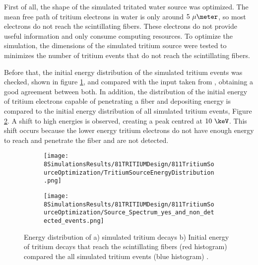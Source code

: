 First of all, the shape of the simulated tritated water source was optimized. The mean free path of tritium electrons in water is only around $5~\mu\meter$, so most electrons do not reach the scintillating fibers. These electrons do not provide useful information and only consume computing resources. To optimize the simulation, the dimensions of the simulated tritium source were tested to minimizes the number of tritium events that do not reach the scintillating fibers. 

Before that, the initial energy distribution of the simulated tritium events was checked, shown in figure \ref{subfig:EnergyDistributionTritiumSource}, and compared with the input taken from \cite{TritiumEmissionSpectrum}, obtaining a good agreement between both. In addition, the distribution of the initial energy of tritium electrons capable of penetrating a fiber and depositing energy is compared to the initial energy distribution of all simulated tritium events, Figure \ref{subfig:EnergySpectrumEventsDetectedandNonDetected}. A shift to high energies is observed, creating a peak centred at $10~\keV$. This shift occurs because the lower energy tritium electrons do not have enough energy to reach and penetrate the fiber and are not detected.

\begin{figure}
\centering
    \begin{subfigure}[b]{0.45\textwidth}
    \centering
    \texttt{[image: 8SimulationsResults/81TRITIUMDesign/811TritiumSourceOptimization/TritiumSourceEnergyDistribution.png]}  
    \caption{\label{subfig:EnergyDistributionTritiumSource}}
    \end{subfigure}
    \hfill
    \begin{subfigure}[b]{0.45\textwidth}
    \centering
    \texttt{[image: 8SimulationsResults/81TRITIUMDesign/811TritiumSourceOptimization/Source\_Spectrum\_yes\_and\_non\_detected\_events.png]}  
    \caption{\label{subfig:EnergySpectrumEventsDetectedandNonDetected}}
    \end{subfigure}
 \caption{Energy distribution of a) simulated tritium decays b) Initial energy of tritium decays that reach the scintillating fibers (red histogram) compared the all simulated tritium events (blue histogram) \cite{SimulationPaperCarlos}.
 \label{fig:TritiumSourceOptimization}}
\end{figure}


